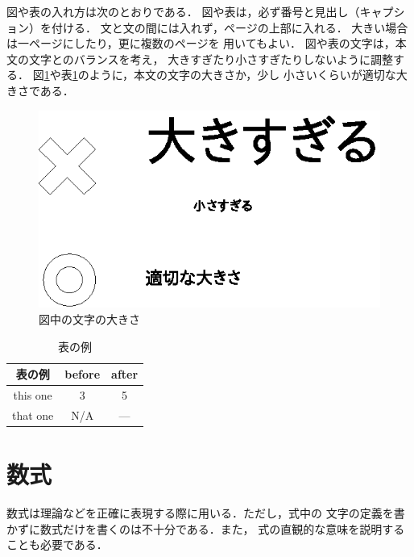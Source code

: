 \documentclass[11pt,master]{oecu-thesis}
\begin{document}
図や表の入れ方は次のとおりである．
図や表は，必ず番号と見出し（キャプション）を付ける．
文と文の間には入れず，ページの上部に入れる．
大きい場合は一ページにしたり，更に複数のページを
用いてもよい．
図や表の文字は，本文の文字とのバランスを考え，
大きすぎたり小さすぎたりしないように調整する．
図\ref{fig:fontsize}や表\ref{tab:sample}のように，本文の文字の大きさか，少し
小さいくらいが適切な大きさである．

\begin{figure}[t]
  \begin{center}
    \includegraphics{samplefigure.eps}
    \caption{図中の文字の大きさ}\label{fig:fontsize}
  \end{center}
\end{figure}

\begin{table}[t]
  \caption{表の例}\label{tab:sample}
  \begin{center}
    \small
    \begin{tabular}{|c||c|c|}
      \hline
      表の例   & before & after \\
      \hline
      \hline
      this one & 3      & 5 \\
      \hline
      that one & N/A    &  --- \\
      \hline
    \end{tabular}
  \end{center}
\end{table}

\section{数式}

数式は理論などを正確に表現する際に用いる．ただし，式中の
文字の定義を書かずに数式だけを書くのは不十分である．また，
式の直観的な意味を説明することも必要である．
\end{document}
